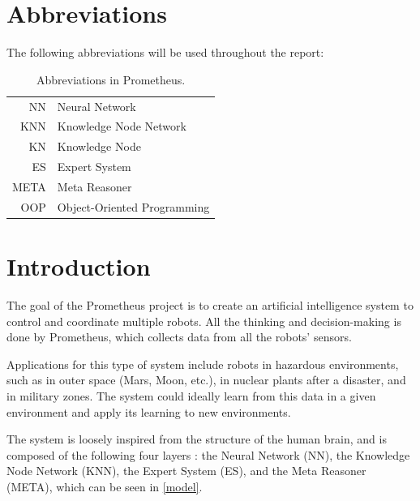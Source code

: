 \documentclass[titlepage,11pt]{article}
\begin{document}
\clearpage
\tableofcontents

\listoffigures
\listoftables
\lstlistoflistings
\clearpage

\twocolumn

\section*{Abbreviations}

The following abbreviations will be used throughout the report:

\begin{table}[!htb]
	\centering
	\caption{Abbreviations in Prometheus.}
	\begin{tabular}{r | l}
		NN & Neural Network \\
		KNN & Knowledge Node Network \\
		KN & Knowledge Node \\
		ES & Expert System \\
		META & Meta Reasoner \\
		OOP & Object-Oriented Programming
	\end{tabular}
	\label{table:abbrevations}
\end{table}

\section{Introduction} \label{sec:intro}

The goal of the Prometheus project is to create an artificial intelligence system to control and coordinate multiple robots. All the thinking and decision-making is done by Prometheus, which collects data from all the robots' sensors.

Applications for this type of system include robots in hazardous environments, such as in outer space (Mars, Moon, etc.), in nuclear plants after a disaster, and in military zones.  The system could ideally learn from this data in a given environment and apply its learning to new environments.

The system is loosely inspired from the structure of the human brain, and is composed of the following four layers \cite{vybihal-model}: the Neural Network (NN), the Knowledge Node Network (KNN), the Expert System (ES), and the Meta Reasoner (META), which can be seen in \autoref{model}.
\end{document}

